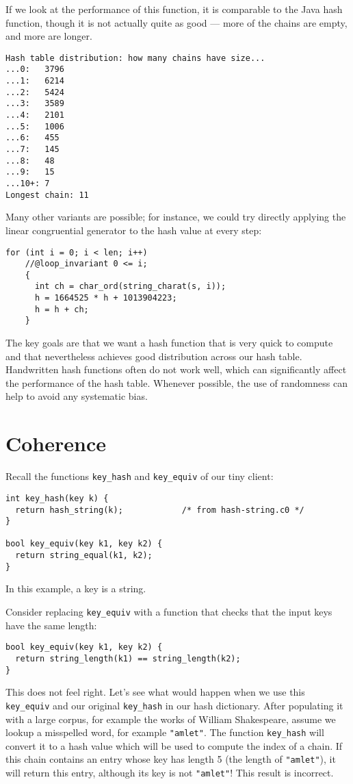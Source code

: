 If we look at the performance of this function, it is comparable to
the Java hash function, though it is not actually quite as good ---
more of the chains are empty, and more are longer.
\begin{lstlisting}[language={[coin]C}]
Hash table distribution: how many chains have size...
...0:   3796
...1:   6214
...2:   5424
...3:   3589
...4:   2101
...5:   1006
...6:   455
...7:   145
...8:   48
...9:   15
...10+: 7
Longest chain: 11
\end{lstlisting}

Many other variants are possible; for instance, we could
try directly applying the linear congruential generator to the hash value
at every step:
\begin{lstlisting}[language={[C0]C}]
  for (int i = 0; i < len; i++)
    //@loop_invariant 0 <= i;
    {
      int ch = char_ord(string_charat(s, i));
      h = 1664525 * h + 1013904223;
      h = h + ch;
    }
\end{lstlisting}
The key goals are that we want a hash function that is very quick to
compute and that nevertheless achieves good distribution across our
hash table.  Handwritten hash functions often do not work well, which
can significantly affect the performance of the hash table.  Whenever
possible, the use of randomness can help to avoid any systematic bias.


\section{Coherence}
\label{sec:hdict:coherence}

Recall the functions \lstinline'key_hash' and \lstinline'key_equiv' of
our tiny client:
\begin{lstlisting}[language={[C0]C}]
int key_hash(key k) {
  return hash_string(k);            /* from hash-string.c0 */
}

bool key_equiv(key k1, key k2) {
  return string_equal(k1, k2);
}
\end{lstlisting}
In this example, a key is a string.

\medskip
Consider replacing \lstinline'key_equiv' with a function that checks
that the input keys have the same length:
\begin{lstlisting}[language={[C0]C}]
bool key_equiv(key k1, key k2) {
  return string_length(k1) == string_length(k2);
}
\end{lstlisting}
This does not feel right.  Let's see what would happen when we use
this \lstinline'key_equiv' and our original \lstinline'key_hash' in
our hash dictionary.  After populating it with a large corpus, for
example the works of William Shakespeare, assume we lookup a
misspelled word, for example \lstinline'"amlet"'.  The function
\lstinline'key_hash' will convert it to a hash value which will be
used to compute the index of a chain.  If this chain contains an entry
whose key has length 5 (the length of \lstinline'"amlet"'), it will
return this entry, although its key is not \lstinline'"amlet"'!  This
result is incorrect.

